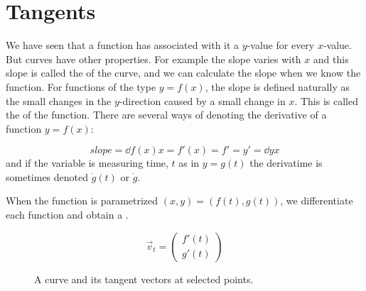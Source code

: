 \section{Tangents}

We have seen that a function has associated with it a $y$-value for every $x$-value. But curves have other 
properties. For example the slope varies with $x$ and this slope is called the  
of the curve, and we can calculate the slope when we know the function.
For functions of the type $y=f(x)$, the slope is defined naturally as the 
small changes in the $y$-direction caused by a small change in $x$. This is 
called the  of the function. There are several ways of denoting the 
derivative of a function $y=f(x)$: 

$$
    slope = \dd{f(x)}{x} = f'(x) = f' = y' = \dd{y}{x}
$$ 
and if the variable is measuring time, $t$ as in $y=g(t)$ the derivatime is
sometimes denoted $\dot{g}(t)$ or $\dot{g}$.

When the function is parametrized $(x,y)=(f(t),g(t))$, we differentiate each
function and obtain a .

$$
     \vec{v}_t = \begin{pmatrix} f'(t) \\ g'(t) \end{pmatrix}
$$

\begin{figure}[h]
\begin{center}
\caption{\small A curve and its tangent vectors at selected points. }
\end{center}
\end{figure}
